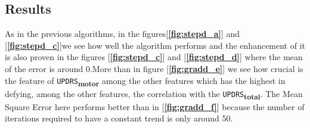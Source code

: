 \documentclass[12pt]{report}
\begin{document}
\subsection{Results}
As in the previous algorithms, in the figures[\textbf{\ref{fig:stepd_a}}] and [\textbf{\ref{fig:stepd_c}}]we see how well the algorithm performs and the enhancement of it is also proven in the figures [\textbf{\ref{fig:stepd_c}}] and [\textbf{\ref{fig:stepd_d}}] where the mean of the error is around $0$.More than in figure [\textbf{\ref{fig:gradd_e}}] we see how crucial is the feature of \texttt{UPDRS}\textsubscript{\textbf{motor}} among the other features which has the highest  in defying, among the other features, the correlation with the \texttt{UPDRS}\textsubscript{\textbf{total}}. The Mean Square Error here performs better than in [\textbf{\ref{fig:gradd_f}}] because the number of iterations required to have a constant trend is only around 50.
\pagebreak
\end{document}
